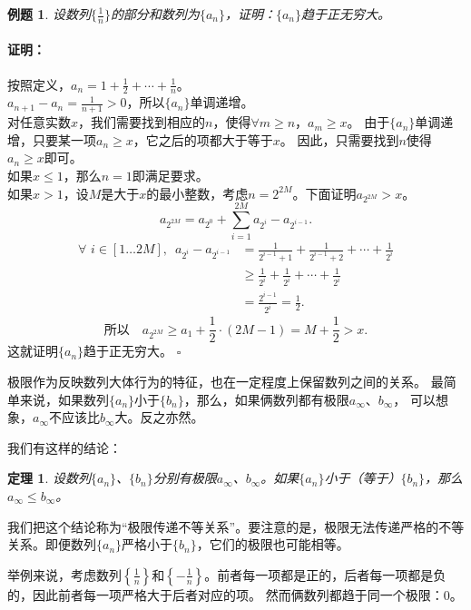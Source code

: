 \documentclass[12pt,UTF8]{ctexbook}
\newtheorem{tm}{定理}[section]
\newtheorem{et}{例题}[section]
\renewenvironment{proof}{\paragraph{\textbf{证明：}}}{\hfill$\square$}
\begin{document}
\begin{et}
    设数列$\{\frac{1}{n}\}$的部分和数列为$\{a_n\}$，证明：$\{a_n\}$趋于正无穷大。
\end{et}
\begin{proof}
    按照定义，$ a_n = 1 + \frac{1}{2} + \cdots + \frac{1}{n}$。\\
    $a_{n+1} - a_n = \frac{1}{n+1} > 0$，所以$\{a_n\}$单调递增。\\
    对任意实数$x$，我们需要找到相应的$n$，使得$\forall m \geqslant n$，$a_m \geqslant x$。
    由于$\{a_n\}$单调递增，只要某一项$a_n \geqslant x$，它之后的项都大于等于$x$。
    因此，只需要找到$n$使得$a_n \geqslant x$即可。\\
    如果$x \leqslant 1$，那么$n=1$即满足要求。\\
    如果$x > 1$，设$M$是大于$x$的最小整数，考虑$n = 2^{2M}$。下面证明$a_{2^{2M}}>x$。\\
    $$ a_{2^{2M}} = a_{2^0} + \sum_{i=1}^{2M}a_{2^i} - a_{2^{i-1}}.$$
    \begin{align*}
        \forall \,\, i\in[1\ldots 2M],\,\,\, a_{2^i} - a_{2^{i-1}} &= \frac{1}{2^{i-1}+1} + \frac{1}{2^{i-1}+2} + \cdots + \frac{1}{2^{i}}  \\
        &\geqslant \frac{1}{2^{i}} + \frac{1}{2^{i}} + \cdots + \frac{1}{2^{i}}  \\
        &= \frac{2^{i-1}}{2^{i}} = \frac{1}{2}. 
    \end{align*}
    $$ \mbox{所以}\quad  a_{2^{2M}} \geqslant a_1 + \frac{1}{2} \cdot (2M - 1) = M + \frac{1}{2} > x. $$
    这就证明$\{a_n\}$趋于正无穷大。
\end{proof}

极限作为反映数列大体行为的特征，也在一定程度上保留数列之间的关系。
最简单来说，如果数列$\{a_n\}$小于$\{b_n\}$，那么，如果俩数列都有极限$a_\infty$、$b_\infty$，
可以想象，$a_\infty$不应该比$b_\infty$大。反之亦然。

我们有这样的结论：
\begin{tm}
    设数列$\{a_n\}$、$\{b_n\}$分别有极限$a_\infty$、$b_\infty$。如果$\{a_n\}$小于（等于）$\{b_n\}$，那么$a_\infty\leqslant b_\infty$。
\end{tm}

我们把这个结论称为“极限传递不等关系”。要注意的是，极限无法传递严格的不等关系。即便数列$\{a_n\}$严格小于$\{b_n\}$，它们的极限也可能相等。

举例来说，考虑数列$\left\{\frac{1}{n}\right\}$和$\left\{-\frac{1}{n}\right\}$。前者每一项都是正的，后者每一项都是负的，因此前者每一项严格大于后者对应的项。
然而俩数列都趋于同一个极限：$0$。
\end{document}
